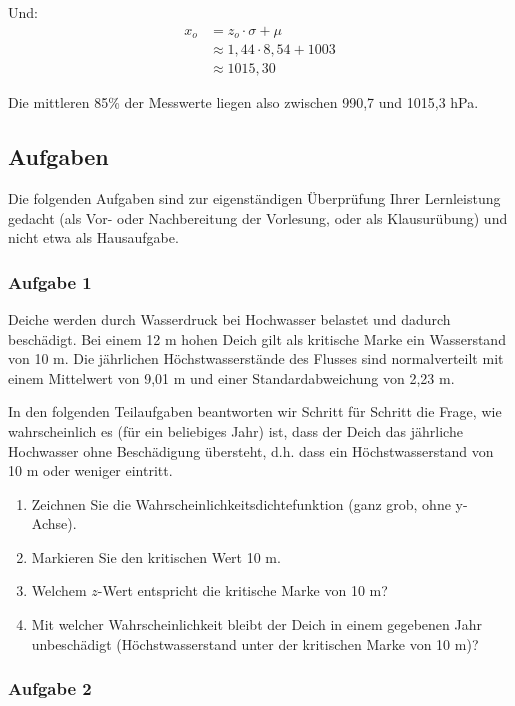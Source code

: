 \documentclass[
  ngerman,
]{article}
\providecommand{\tightlist}{%
  \setlength{\itemsep}{0pt}\setlength{\parskip}{0pt}}
\begin{document}
Und:
\[
  \begin{aligned}
    x_o&=z_o\cdot \sigma + \mu  \\
    &\approx1,44 \cdot 8,54 + 1003\\
    & \approx 1015,30
  \end{aligned}
\]

Die mittleren 85\% der Messwerte liegen also zwischen 990,7 und 1015,3 hPa.

\hypertarget{aufgaben-2}{%
\subsection{Aufgaben}\label{aufgaben-2}}

Die folgenden Aufgaben sind zur eigenständigen Überprüfung Ihrer Lernleistung gedacht (als Vor- oder Nachbereitung der Vorlesung, oder als Klausurübung) und nicht etwa als Hausaufgabe.

\hypertarget{aufgabe-1-2}{%
\subsubsection{Aufgabe 1}\label{aufgabe-1-2}}

Deiche werden durch Wasserdruck bei Hochwasser belastet und dadurch beschädigt. Bei einem 12 m hohen Deich gilt als kritische Marke ein Wasserstand von 10 m. Die jährlichen Höchstwasserstände des Flusses sind normalverteilt mit einem Mittelwert von 9,01 m und einer Standardabweichung von 2,23 m.

In den folgenden Teilaufgaben beantworten wir Schritt für Schritt die Frage, wie wahrscheinlich es (für ein beliebiges Jahr) ist, dass der Deich das jährliche Hochwasser ohne Beschädigung übersteht, d.h. dass ein Höchstwasserstand von 10 m oder weniger eintritt.

\begin{enumerate}
\def\labelenumi{\alph{enumi})}
\tightlist
\item
  Zeichnen Sie die Wahrscheinlichkeitsdichtefunktion (ganz grob, ohne y-Achse).
\item
  Markieren Sie den kritischen Wert 10 m.
\item
  Welchem \(z\)-Wert entspricht die kritische Marke von 10 m?
\item
  Mit welcher Wahrscheinlichkeit bleibt der Deich in einem gegebenen Jahr unbeschädigt (Höchstwasserstand unter der kritischen Marke von 10 m)?
\end{enumerate}

\hypertarget{aufgabe-2-2}{%
\subsubsection{Aufgabe 2}\label{aufgabe-2-2}}
\end{document}
